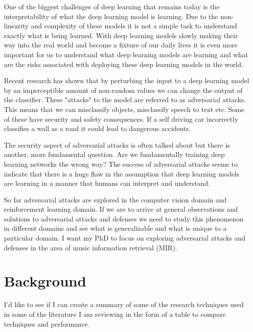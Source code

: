 \documentclass[journal,onecolumn]{IEEEtran}
\begin{document}
One of the biggest challenges of deep learning that remains today is the interpretability of what the deep learning model is learning. Due to the non-linearity and complexity of these models it is not a simple task to understand exactly what is being learned. With deep learning models slowly making their way into the real world and become a fixture of our daily lives it is even more important for us to understand what deep learning models are learning and what are the risks associated with deploying these deep learning models in the world.

Recent research has shown that by perturbing the input to a deep learning model by an imperceptible amount of non-random values we can change the output of the classifier. These "attacks" to the model are referred to as adversarial attacks. This means that we can misclassify objects, misclassify speech to text etc. Some of these have security and safety consequences. If a self driving car incorrectly classifies a wall as a road it could lead to dangerous accidents. 

The security aspect of adversarial attacks is often talked about but there is another, more fundamental question. Are we fundamentally training deep learning networks the wrong way? The success of adversarial attacks seems to indicate that there is a huge flaw in the assumption that deep learning models are learning in a manner that humans can interpret and understand.

So far adversarial attacks are explored in the computer vision domain and reinforcement learning domain. If we are to arrive at general observations and solutions to adversarial attacks and defenses we need to study this phenomenon in different domains and see what is generalizable and what is unique to a particular domain. I want my PhD to focus on  exploring adversarial attacks and defenses in the  area of music information retrieval (MIR).  

 

	

\section{Background}

I'd like to see if I can create a summary of some of the research techniques used in some of the literature I am reviewing in the form of a table to compare techniques and performance.
\end{document}
